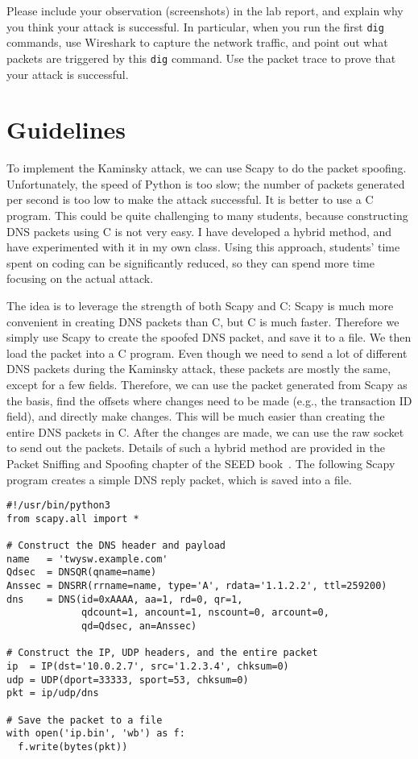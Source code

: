Please include your observation (screenshots) in the lab 
report, and explain why you think your attack is successful. 
In particular, when you run the first \texttt{dig} commands,
use Wireshark to capture the network traffic, and 
point out what packets are triggered by this
\texttt{dig} command. Use the packet trace to 
prove that your attack is successful. 




\section{Guidelines} 

To implement the Kaminsky attack, we can use Scapy to do the packet spoofing. Unfortunately,
the speed of Python is too slow; the number of packets generated per second is too low to
make the attack successful. It is better to use a C program. This could
be quite challenging to many students, because constructing DNS packets using C is not very
easy. I have developed a hybrid method, and have experimented with it in my own class. Using
this approach, students' time spent on coding can be significantly reduced, so they can spend
more time focusing on the actual attack.


The idea is to leverage the strength of both Scapy and C: Scapy is much more convenient in
creating DNS packets than C, but C is much faster. Therefore we simply
use Scapy to create the spoofed DNS packet, and save it to a file.
We then load the packet into a C program. Even though we need to send a 
lot of different DNS packets
during the Kaminsky attack, these packets are mostly the same, except for a few fields. 
Therefore, we can
use the packet generated from Scapy as the basis, find the offsets where
changes need to be made (e.g., the transaction ID field),
and directly make changes. This will be much easier than
creating the entire DNS packets in C.
After the changes are made, we can use the raw socket to send out the packets.
Details of such a hybrid method are provided in
the Packet Sniffing and Spoofing chapter 
of the SEED book~\cite{seedbook}.
The following Scapy program creates a simple DNS reply packet, 
which is saved into a file.


\begin{lstlisting}[caption={\texttt{generate\_dns\_reply.py}}]
#!/usr/bin/python3
from scapy.all import *

# Construct the DNS header and payload
name   = 'twysw.example.com'
Qdsec  = DNSQR(qname=name)
Anssec = DNSRR(rrname=name, type='A', rdata='1.1.2.2', ttl=259200)
dns    = DNS(id=0xAAAA, aa=1, rd=0, qr=1, 
             qdcount=1, ancount=1, nscount=0, arcount=0, 
             qd=Qdsec, an=Anssec)

# Construct the IP, UDP headers, and the entire packet
ip  = IP(dst='10.0.2.7', src='1.2.3.4', chksum=0)
udp = UDP(dport=33333, sport=53, chksum=0)
pkt = ip/udp/dns

# Save the packet to a file
with open('ip.bin', 'wb') as f:
  f.write(bytes(pkt))
\end{lstlisting}

